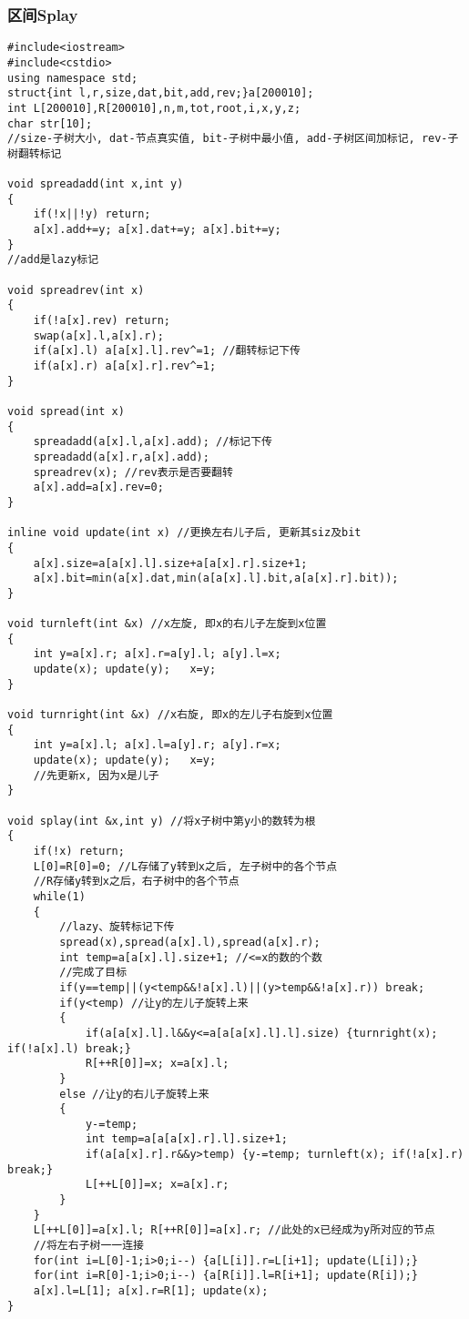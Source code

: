 \documentclass[twoside]{article}
\begin{document}
\subsubsection{区间Splay}
\begin{lstlisting}
#include<iostream>
#include<cstdio>
using namespace std;
struct{int l,r,size,dat,bit,add,rev;}a[200010];
int L[200010],R[200010],n,m,tot,root,i,x,y,z;
char str[10];
//size-子树大小, dat-节点真实值, bit-子树中最小值, add-子树区间加标记, rev-子树翻转标记

void spreadadd(int x,int y)
{
	if(!x||!y) return;
	a[x].add+=y; a[x].dat+=y; a[x].bit+=y;
}
//add是lazy标记

void spreadrev(int x)
{
	if(!a[x].rev) return;
	swap(a[x].l,a[x].r);
	if(a[x].l) a[a[x].l].rev^=1; //翻转标记下传
	if(a[x].r) a[a[x].r].rev^=1;
}

void spread(int x)
{
	spreadadd(a[x].l,a[x].add); //标记下传
	spreadadd(a[x].r,a[x].add);
	spreadrev(x); //rev表示是否要翻转
	a[x].add=a[x].rev=0;	
}

inline void update(int x) //更换左右儿子后, 更新其siz及bit
{
	a[x].size=a[a[x].l].size+a[a[x].r].size+1;
	a[x].bit=min(a[x].dat,min(a[a[x].l].bit,a[a[x].r].bit));
}

void turnleft(int &x) //x左旋, 即x的右儿子左旋到x位置
{
	int y=a[x].r; a[x].r=a[y].l; a[y].l=x;
	update(x); update(y);	x=y;
}

void turnright(int &x) //x右旋, 即x的左儿子右旋到x位置
{
	int y=a[x].l; a[x].l=a[y].r; a[y].r=x;
	update(x); update(y);	x=y;
	//先更新x, 因为x是儿子
}

void splay(int &x,int y) //将x子树中第y小的数转为根
{
	if(!x) return;
	L[0]=R[0]=0; //L存储了y转到x之后, 左子树中的各个节点
	//R存储y转到x之后，右子树中的各个节点
	while(1)
	{
		//lazy、旋转标记下传
		spread(x),spread(a[x].l),spread(a[x].r);
		int temp=a[a[x].l].size+1; //<=x的数的个数
		//完成了目标
		if(y==temp||(y<temp&&!a[x].l)||(y>temp&&!a[x].r)) break;
		if(y<temp) //让y的左儿子旋转上来
		{
			if(a[a[x].l].l&&y<=a[a[a[x].l].l].size) {turnright(x); if(!a[x].l) break;}
			R[++R[0]]=x; x=a[x].l;
		}
		else //让y的右儿子旋转上来
		{
			y-=temp;
			int temp=a[a[a[x].r].l].size+1;
			if(a[a[x].r].r&&y>temp) {y-=temp; turnleft(x); if(!a[x].r) break;}
			L[++L[0]]=x; x=a[x].r;
		}
	}
	L[++L[0]]=a[x].l; R[++R[0]]=a[x].r; //此处的x已经成为y所对应的节点
	//将左右子树一一连接
	for(int i=L[0]-1;i>0;i--) {a[L[i]].r=L[i+1]; update(L[i]);}
	for(int i=R[0]-1;i>0;i--) {a[R[i]].l=R[i+1]; update(R[i]);}
	a[x].l=L[1]; a[x].r=R[1]; update(x);
}


\end{lstlisting}
\end{document}
